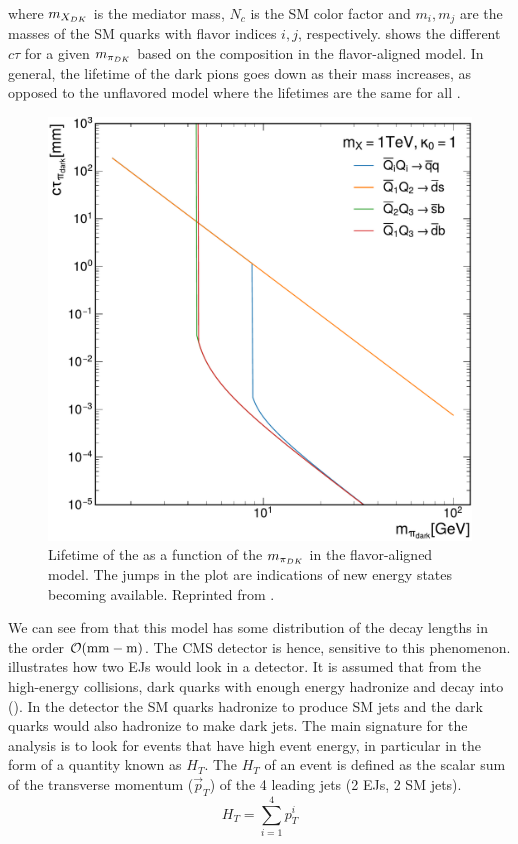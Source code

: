 where $m_{X_{DK}}$ is the mediator mass, $N_c$ is the SM color factor and $m_i, m_j$ are the masses of the SM quarks with flavor indices $i, j$, respectively\cite{CMS:2024gxp}.
 shows the different $c\tau$ for a given $m_{\pi_{DK}}$ based on the \pidark composition in the flavor-aligned model. In general, the lifetime of the dark pions goes down as their mass increases, as opposed to the unflavored model where the lifetimes are the same for all \pidark.
\begin{figure}[b]
	\centering
	\includegraphics[width=.65\linewidth]{Images/pdfs/FlavoredLifetime.pdf}
	\caption[Lifetimes of the dark pions as a function of their mass.]{Lifetime of the \pidark as a function of the $m_{\pi_{DK}}$ in the flavor-aligned model. The jumps in the plot are indications of new energy states becoming available. Reprinted from \cite{CMS:2024gxp}.}
	\label{fig:lifetimes}
\end{figure}

We can see from  that this model has some distribution of the decay lengths in the order $\order{\unit{mm} - \unit{m}}$. The CMS detector is hence, sensitive to this phenomenon.
 illustrates how two EJs would look in a detector. It is assumed that from the high-energy collisions, dark quarks with enough energy hadronize and decay into (\pidark). In the detector the SM quarks hadronize to produce SM jets and the dark quarks would also hadronize to make dark jets. The main signature for the analysis is to look for events that have high event energy, in particular in the form of a quantity known as $H_T$. The $H_T$ of an event is defined as the scalar sum of the transverse momentum ($\Vec{p}_T$) of the 4 leading jets (2 EJs, 2 SM jets).
\begin{equation}
	H_T = \sum_{i=1}^4 p_T^i
\end{equation}

